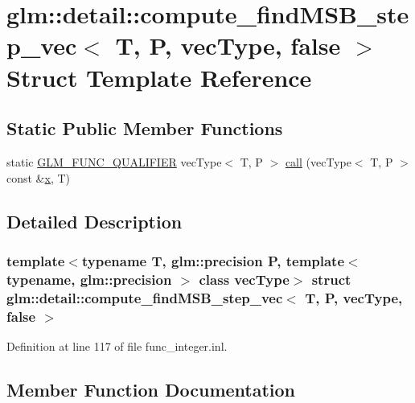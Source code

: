 \hypertarget{structglm_1_1detail_1_1compute__find_m_s_b__step__vec_3_01_t_00_01_p_00_01vec_type_00_01false_01_4}{}\section{glm\+::detail\+::compute\+\_\+find\+M\+S\+B\+\_\+step\+\_\+vec$<$ T, P, vec\+Type, false $>$ Struct Template Reference}
\label{structglm_1_1detail_1_1compute__find_m_s_b__step__vec_3_01_t_00_01_p_00_01vec_type_00_01false_01_4}
\subsection*{Static Public Member Functions}
\begin{DoxyCompactItemize}
\item 
static \mbox{\hyperlink{setup_8hpp_a33fdea6f91c5f834105f7415e2a64407}{G\+L\+M\+\_\+\+F\+U\+N\+C\+\_\+\+Q\+U\+A\+L\+I\+F\+I\+ER}} vec\+Type$<$ T, P $>$ \mbox{\hyperlink{structglm_1_1detail_1_1compute__find_m_s_b__step__vec_3_01_t_00_01_p_00_01vec_type_00_01false_01_4_a6be49d6f06a7dd467a63a87a6d2af757}{call}} (vec\+Type$<$ T, P $>$ const \&\mbox{\hyperlink{glad_8h_a92d0386e5c19fb81ea88c9f99644ab1d}{x}}, T)
\end{DoxyCompactItemize}


\subsection{Detailed Description}
\subsubsection*{template$<$typename T, glm\+::precision P, template$<$ typename, glm\+::precision $>$ class vec\+Type$>$\newline
struct glm\+::detail\+::compute\+\_\+find\+M\+S\+B\+\_\+step\+\_\+vec$<$ T, P, vec\+Type, false $>$}



Definition at line 117 of file func\+\_\+integer.\+inl.



\subsection{Member Function Documentation}
\mbox{\label{structglm_1_1detail_1_1compute__find_m_s_b__step__vec_3_01_t_00_01_p_00_01vec_type_00_01false_01_4_a6be49d6f06a7dd467a63a87a6d2af757}} 
